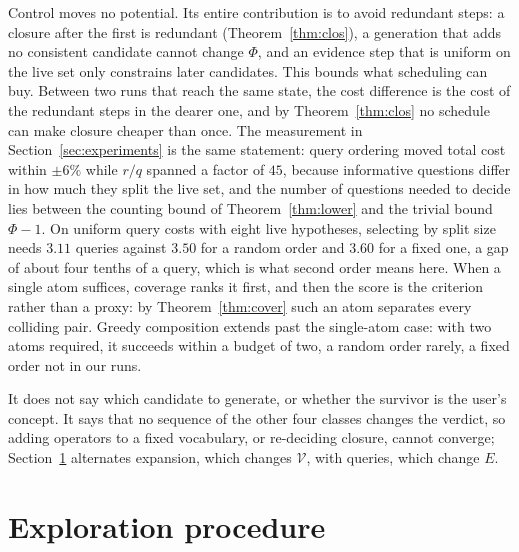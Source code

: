 \documentclass[11pt]{article}
\newcommand{\Vocab}{\mathcal{V}}
\begin{document}
Control moves no potential. Its entire contribution is to avoid redundant steps: a closure after the
first is redundant (Theorem~\ref{thm:clos}), a generation that adds no consistent candidate
cannot change $\Phi$, and an evidence step that is uniform on the live set only constrains later
candidates. This bounds
what scheduling can buy. Between two runs that reach the same state, the cost difference is the cost
of the redundant steps in the dearer one, and by Theorem~\ref{thm:clos} no schedule can make closure
cheaper than once. The measurement in Section~\ref{sec:experiments} is the same statement: query ordering
moved total cost within $\pm 6\%$ while $r/q$ spanned a factor of $45$, because informative questions
differ in how much they split the live set, and the number of questions needed to decide lies between
the counting bound of Theorem~\ref{thm:lower} and the trivial bound $\Phi-1$. On uniform query costs
with eight live hypotheses, selecting by split size needs $3.11$ queries against $3.50$ for a random
order and $3.60$ for a fixed one, a gap of about four tenths of a query, which is what
second order means here. When a single atom suffices, coverage ranks it first, and then the score is
the criterion rather than a proxy: by Theorem~\ref{thm:cover} such an atom separates every colliding
pair. Greedy composition extends past the single-atom case: with two atoms required, it succeeds
within a budget of two, a random order rarely, a fixed order not in our runs.

It does not say which candidate to generate, or whether the survivor is the user's concept. It says
that no sequence of the other four classes changes the verdict, so adding operators to a fixed
vocabulary, or re-deciding closure, cannot converge; Section~\ref{sec:exploration} alternates expansion,
which changes $\Vocab$, with queries, which change $E$.

\section{Exploration procedure}\label{sec:exploration}
\end{document}
